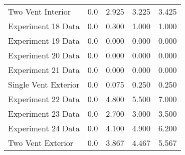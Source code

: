 \begin{tabular}{lrrrr}
Two Vent Interior    &       0.0 &            2.925 &            3.225 &      3.425 \\
Experiment 18 Data   &       0.0 &            0.300 &            1.000 &      1.000 \\
Experiment 19 Data   &       0.0 &            0.000 &            0.000 &      0.000 \\
Experiment 20 Data   &       0.0 &            0.000 &            0.000 &      0.000 \\
Experiment 21 Data   &       0.0 &            0.000 &            0.000 &      0.000 \\
Single Vent Exterior &       0.0 &            0.075 &            0.250 &      0.250 \\
Experiment 22 Data   &       0.0 &            4.800 &            5.500 &      7.000 \\
Experiment 23 Data   &       0.0 &            2.700 &            3.000 &      3.500 \\
Experiment 24 Data   &       0.0 &            4.100 &            4.900 &      6.200 \\
Two Vent Exterior    &       0.0 &            3.867 &            4.467 &      5.567 \\
\bottomrule
\end{tabular}
